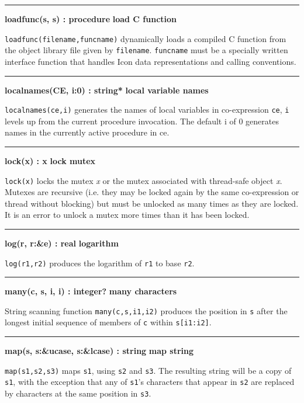 \bigskip\hrule\vspace{0.1cm}
\noindent
{\bf loadfunc(s, s) : procedure } \hfill {\bf load C function}

\noindent
{}\texttt{loadfunc(filename,funcname)} dynamically
loads a compiled C function from the object library file given by
\texttt{filename}. \texttt{funcname} must be a specially written
interface function that handles Icon data representations and calling
conventions.

\bigskip\hrule\vspace{0.1cm}
\noindent
{\bf localnames(CE, i:0) : string* } \hfill {\bf local variable names}

\noindent
{}\texttt{localnames(ce,i)} generates the
names of local variables in co-expression \texttt{ce}, \texttt{i}
levels up from the current procedure invocation. The default i of 0
generates names in the currently active procedure in ce.

\bigskip\hrule\vspace{0.1cm}
\noindent
{\bf lock(x) : x } \hfill {\bf lock mutex}

\noindent
{}\texttt{lock(x)} locks the mutex {\textit x} or the mutex
associated with thread-safe object {\textit x}.
Mutexes are recursive (i.e. they may be locked again by the same co-expression
or thread without blocking) but must be unlocked as many times as they are
locked. It is an error to unlock a mutex more times than it has been locked.

\bigskip\hrule\vspace{0.1cm}
\noindent
{\bf log(r, r:\&e) : real } \hfill {\bf logarithm}

\noindent
{}\texttt{log(r1,r2)} produces the logarithm of
\texttt{r1} to base \texttt{r2}.

\bigskip\hrule\vspace{0.1cm}
\noindent
{\bf many(c, s, i, i) : integer? } \hfill {\bf many characters}

\noindent
{}String scanning function \texttt{many(c,s,i1,i2)} produces
the position in \texttt{s} after the longest initial sequence of
members of \texttt{c} within \texttt{s[i1:i2]}.

\bigskip\hrule\vspace{0.1cm}
\noindent
{\bf map(s, s:\&ucase, s:\&lcase) : string } \hfill {\bf map string}

\noindent
{}\texttt{map(s1,s2,s3)} maps \texttt{s1}, using
\texttt{s2} and \texttt{s3}. The resulting string will be a copy of
\texttt{s1}, with the exception that any of
\texttt{s1}'s characters that appear in \texttt{s2}
are replaced by characters at the same position in \texttt{s3}.

